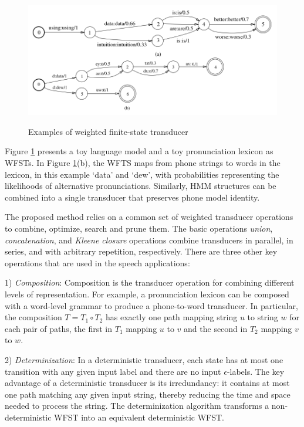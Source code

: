 \documentclass[paper=a4, fontsize=18pt]{article} %
\numberwithin{equation}{section} %
\numberwithin{figure}{section} %
\numberwithin{table}{section} %
\begin{document}
\begin{figure}[h]
  \centering
  \includegraphics[width=\linewidth]{11_21_WFST.png}\\
  \caption{Examples of weighted finite-state transducer}\label{fig:WFST}
\end{figure}

Figure \ref{fig:WFST} presents a toy language model and a toy pronunciation lexicon as WFSTs. In Figure \ref{fig:WFST}(b), the WFTS maps from phone strings to words in the lexicon, in this example `data' and `dew', with probabilities representing the likelihoods of alternative pronunciations. Similarly, HMM structures can be combined into a single transducer that preserves phone model identity.

The proposed method relies on a common set of weighted transducer operations to combine, optimize, search and prune them. The basic operations \emph{union}, \emph{concatenation}, and \emph{Kleene closure} operations combine transducers in parallel, in series, and with arbitrary repetition, respectively. There are three other key operations that are used in the speech applications:

1) \emph{Composition}: Composition is the transducer operation for combining different levels of representation. For example, a pronunciation lexicon can be composed with a word-level grammar to produce a phone-to-word transducer. In particular, the composition $T = T_1 \circ T_2$ has exactly one path mapping string $u$ to string $w$ for each pair of paths, the first in $T_1$ mapping $u$ to $v$ and the second in $T_2$ mapping $v$ to $w$.

2) \emph{Determinization}: In a deterministic transducer, each state has at most one transition with any given input label and there are no input $\epsilon$-labels. The key advantage of a deterministic transducer is its irredundancy: it contains at most one path matching any given input string, thereby reducing the time and space needed to process the string. The determinization algorithm transforms a non-deterministic WFST into an equivalent deterministic WFST.
\end{document}
